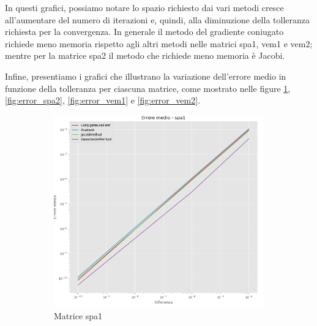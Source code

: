 In questi grafici, possiamo notare lo spazio richiesto dai vari metodi cresce
all'aumentare del numero di iterazioni e, quindi, alla diminuzione della tolleranza
richiesta per la convergenza. In generale il metodo del gradiente coniugato richiede
meno memoria rispetto agli altri metodi nelle matrici spa1, vem1 e vem2; mentre per
la matrice spa2 il metodo che richiede meno memoria è Jacobi.

Infine, presentiamo i grafici che illustrano la variazione dell'errore medio in
funzione della tolleranza per ciascuna matrice, come mostrato nelle figure \ref{fig:error_spa1},
\ref{fig:error_spa2}, \ref{fig:error_vem1} e \ref{fig:error_vem2}.

\begin{figure}[!ht]
    \centering
    \begin{subfigure}{0.45\textwidth}
        \centering
        \includegraphics[width=\textwidth]{./../report/Progetto_1_bis/img/error_spa1.png}
        \caption{Matrice spa1}
        \label{fig:error_spa1}
    \end{subfigure}
    \begin{subfigure}{0.45\textwidth}
        \centering

\end{subfigure}
\end{figure}
